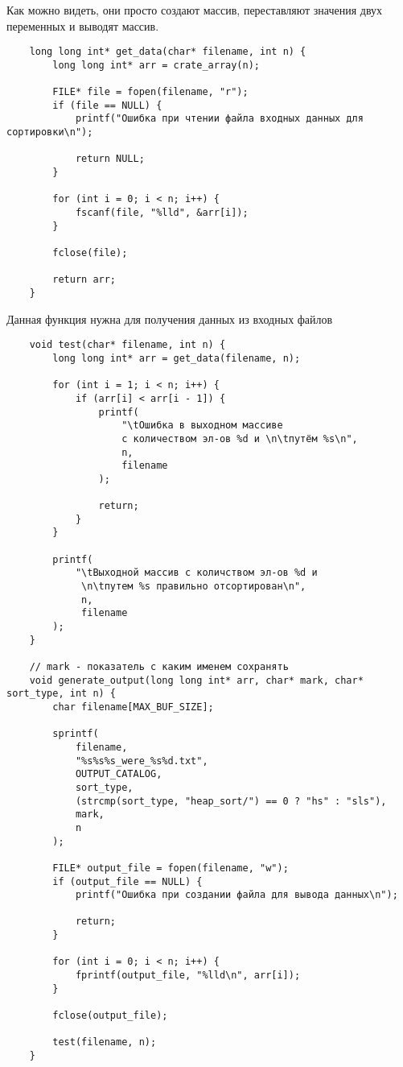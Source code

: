 \documentclass[a4paper,12pt,titlepage,finall]{article}
\begin{document}
Как можно видеть, они просто создают массив, переставляют значения двух переменных и выводят массив. \\

\begin{verbatim}
    long long int* get_data(char* filename, int n) {
        long long int* arr = crate_array(n);
    
        FILE* file = fopen(filename, "r");
        if (file == NULL) {
            printf("Ошибка при чтении файла входных данных для сортировки\n");
    
            return NULL;
        }
    
        for (int i = 0; i < n; i++) {
            fscanf(file, "%lld", &arr[i]);
        }
    
        fclose(file);
    
        return arr;
    }
\end{verbatim}

Данная функция нужна для получения данных из входных файлов

\begin{verbatim}
    void test(char* filename, int n) {
        long long int* arr = get_data(filename, n);
    
        for (int i = 1; i < n; i++) {
            if (arr[i] < arr[i - 1]) {
                printf(
                    "\tОшибка в выходном массиве
                    с количеством эл-ов %d и \n\tпутём %s\n",
                    n,
                    filename
                );

                return;
            }
        }
    
        printf(
            "\tВыходной массив с количством эл-ов %d и
             \n\tпутем %s правильно отсортирован\n",
             n,
             filename
        );
    }
    
    // mark - показатель с каким именем сохранять 
    void generate_output(long long int* arr, char* mark, char* sort_type, int n) {
        char filename[MAX_BUF_SIZE];
    
        sprintf(
            filename,
            "%s%s%s_were_%s%d.txt",
            OUTPUT_CATALOG,
            sort_type,
            (strcmp(sort_type, "heap_sort/") == 0 ? "hs" : "sls"),
            mark,
            n
        );
    
        FILE* output_file = fopen(filename, "w");
        if (output_file == NULL) {
            printf("Ошибка при создании файла для вывода данных\n");
    
            return;
        }
    
        for (int i = 0; i < n; i++) {
            fprintf(output_file, "%lld\n", arr[i]);
        }
    
        fclose(output_file);
    
        test(filename, n);
    }
\end{verbatim}
\end{document}
